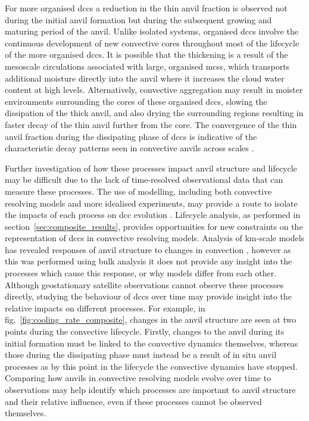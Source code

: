 For more organised \acrshort{dcc}s a reduction in the thin anvil fraction is observed not during the initial anvil formation but during the subsequent growing and maturing period of the anvil.
Unlike isolated systems, organised \acrshort{dcc}s involve the continuous development of new convective cores throughout most of the lifecycle of the more organised \acrshort{dcc}s.
It is possible that the thickening is a result of the mesoscale circulations associated with large, organised \acrshort{mcs}s, which transports additional moisture directly into the anvil where it increases the cloud water content at high levels.  
Alternatively, convective aggregation may result in moister environments surrounding the cores of these organised \acrshort{dcc}s, slowing the dissipation of the thick anvil, and also drying the surrounding regions resulting in faster decay of the thin anvil further from the core.
The convergence of the thin anvil fraction during the dissipating phase of \acrshort{dcc}s is indicative of the characteristic decay patterns seen in convective anvils across scales \citep{roca_simple_2017, elsaesser_simple_2022}.

Further investigation of how these processes impact anvil structure and lifecycle may be difficult due to the lack of time-resolved observational data that can measure these processes.
The use of modelling, including both convective resolving models and more idealised experiments, may provide a route to isolate the impacts of each process on \acrshort{dcc} evolution \citep{gasparini_diurnal_2022}.
Lifecycle analysis, as performed in section~\ref{sec:composite_results}, provides opportunities for new constraints on the representation of \acrshort{dcc}s in convective resolving models.
Analysis of km-scale models has revealed responses of anvil structure to changes in convection \citep{sokol_greater_2024}, however as this was performed using bulk analysis it does not provide any insight into the processes which cause this response, or why models differ from each other.
Although geostationary satellite observations cannot observe these processes directly, studying the behaviour of \acrshort{dcc}s over time may provide insight into the relative impacts on different processes.
For example, in fig.~\ref{fig:cooling_rate_composite}, changes in the anvil structure are seen at two points during the convective lifecycle.
Firstly, changes to the anvil during its initial formation must be linked to the convective dynamics themselves, whereas those during the dissipating phase must instead be a result of in situ anvil processes as by this point in the lifecycle the convective dynamics have stopped.
Comparing how anvils in convective resolving models evolve over time to observations may help identify which processes are important to anvil structure and their relative influence, even if these processes cannot be observed themselves.

